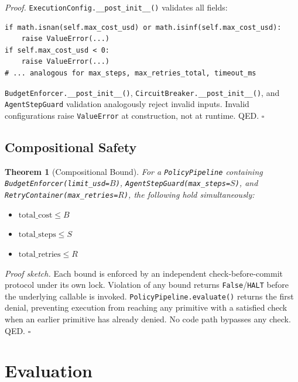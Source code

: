 \documentclass[11pt]{article}
\newtheorem{theorem}{Theorem}
\newenvironment{proof}{\par\noindent\textit{Proof.}\enspace}{\hfill$\square$\par\medskip}
\newenvironment{proofsketch}{\par\noindent\textit{Proof sketch.}\enspace}{\hfill$\square$\par\medskip}
\begin{document}
\begin{proof}
\texttt{ExecutionConfig.\_\_post\_init\_\_()} validates all fields:

\begin{lstlisting}
if math.isnan(self.max_cost_usd) or math.isinf(self.max_cost_usd):
    raise ValueError(...)
if self.max_cost_usd < 0:
    raise ValueError(...)
# ... analogous for max_steps, max_retries_total, timeout_ms
\end{lstlisting}

\texttt{BudgetEnforcer.\_\_post\_init\_\_()},
\texttt{CircuitBreaker.\_\_post\_init\_\_()}, and \texttt{AgentStepGuard}
validation analogously reject invalid inputs. Invalid configurations raise
\texttt{ValueError} at construction, not at runtime. QED.
\end{proof}

\subsection{Compositional Safety}

\begin{theorem}[Compositional Bound]
For a \texttt{PolicyPipeline} containing
\texttt{BudgetEnforcer(limit\_usd=$B$)},
\texttt{AgentStepGuard(max\_steps=$S$)}, and
\texttt{RetryContainer(max\_retries=$R$)}, the following hold simultaneously:
\begin{itemize}[nosep]
  \item $\text{total\_cost} \leq B$
  \item $\text{total\_steps} \leq S$
  \item $\text{total\_retries} \leq R$
\end{itemize}
\end{theorem}

\begin{proofsketch}
Each bound is enforced by an independent check-before-commit protocol under
its own lock. Violation of any bound returns \texttt{False}/\texttt{HALT}
before the underlying callable is invoked.
\texttt{PolicyPipeline.evaluate()} returns the first denial, preventing
execution from reaching any primitive with a satisfied check when an earlier
primitive has already denied. No code path bypasses any check. QED.
\end{proofsketch}

\section{Evaluation}
\label{sec:evaluation}
\end{document}
